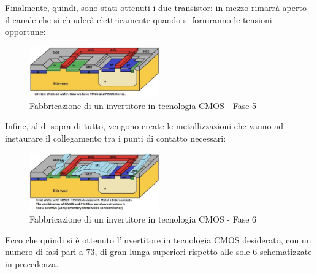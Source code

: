\documentclass[a4paper]{extarticle}
\begin{document}
\noindent
Finalmente, quindi, sono stati ottenuti i due transistor: in mezzo rimarrà aperto il canale che si chiuderà elettricamente quando si forniranno le tensioni opportune:

\begin{figure}[H]
    \centering
    \includegraphics[width=0.5\textwidth]{fabbricazione-invertitore-cmos-5.png}
    \caption{Fabbricazione di un invertitore in tecnologia CMOS - Fase 5}
    \label{fig:fabbricazione_invertitore_cmos_5}
\end{figure}

\noindent
Infine, al di sopra di tutto, vengono create le metallizzazioni che vanno ad instaurare il collegamento tra i punti di contatto necessari:

\begin{figure}[H]
    \centering
    \includegraphics[width=0.5\textwidth]{fabbricazione-invertitore-cmos-6.png}
    \caption{Fabbricazione di un invertitore in tecnologia CMOS - Fase 6}
    \label{fig:fabbricazione_invertitore_cmos_6}
\end{figure}

\vspace{1em}
\noindent
Ecco che quindi si è ottenuto l'invertitore in tecnologia CMOS desiderato, con un numero di fasi pari a $73$, di gran lunga superiori rispetto alle sole $6$ schematizzate in precedenza.
\end{document}
